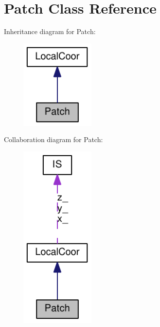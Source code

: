 \hypertarget{classPatch}{
\section{Patch Class Reference}
\label{classPatch}
}
Inheritance diagram for Patch:\nopagebreak
\begin{figure}[H]
\begin{center}
\leavevmode
\includegraphics[width=105pt]{classPatch__inherit__graph}
\end{center}
\end{figure}
Collaboration diagram for Patch:\nopagebreak
\begin{figure}[H]
\begin{center}
\leavevmode
\includegraphics[width=105pt]{classPatch__coll__graph}
\end{center}
\end{figure}
